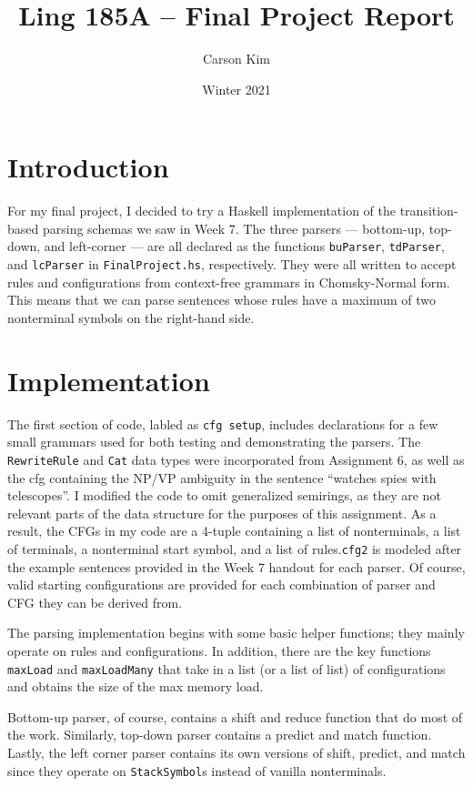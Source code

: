 \documentclass[12pt, letterpaper]{article}
\title{Ling 185A -- Final Project Report}
\author{Carson Kim}
\date{Winter 2021}
\begin{document}
\maketitle

\section{Introduction}
For my final project, I decided to try a Haskell implementation of the transition-based parsing schemas we saw in Week 7. The three parsers --- bottom-up, top-down, and left-corner --- are all declared as the functions \verb|buParser|, \verb|tdParser|, and \verb|lcParser| in \verb|FinalProject.hs|, respectively. They were all written to accept rules and configurations from context-free grammars in Chomsky-Normal form. This means that we can parse sentences whose rules have a maximum of two nonterminal symbols on the right-hand side. 

\section{Implementation}
The first section of code, labled as \verb|cfg setup|, includes declarations for a few small grammars used for both testing and demonstrating the parsers. The \verb|RewriteRule| and \verb|Cat| data types were incorporated from Assignment 6, as well as the cfg containing the NP/VP ambiguity in the sentence “watches spies with telescopes”. I modified the code to omit generalized semirings, as they are not relevant parts of the data structure for the purposes of this assignment. As a result, the CFGs in my code are a 4-tuple containing a list of nonterminals, a list of terminals, a nonterminal start symbol, and a list of rules.\verb|cfg2| is modeled after the example sentences provided in the Week 7 handout for each parser. Of course, valid starting configurations are provided for each combination of parser and CFG they can be derived from.

The parsing implementation begins with some basic helper functions; they mainly operate on rules and configurations. In addition, there are the key functions \verb|maxLoad| and \verb|maxLoadMany| that take in a list (or a list of list) of configurations and obtains the size of the max memory load. 

Bottom-up parser, of course, contains a shift and reduce function that do most of the work. Similarly, top-down parser contains a predict and match function. Lastly, the left corner parser contains its own versions of shift, predict, and match since they operate on \verb|StackSymbol|s instead of vanilla nonterminals. 
\end{document}
